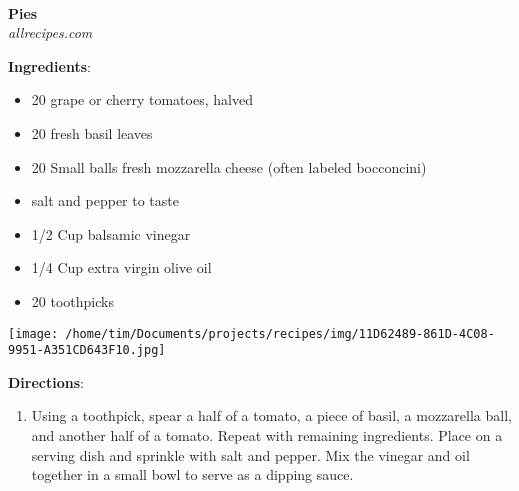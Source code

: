 \documentclass[11pt, twoside, openany]{book}
\begin{document}
{\\\LARGE \textbf{Pies}} \label{pies}\\
 \label{tomato-and-mozzarella-bites}\hfill\textit{allrecipes.com}\\
\begin{minipage}[t]{0.8\linewidth}
\textbf{Ingredients}:\vspace{-3mm}
\begin{multicols}{2}
\begin{itemize}\setlength\itemsep{-1mm}
\item 20 grape or cherry tomatoes, halved
\item 20 fresh basil leaves
\item 20 Small balls fresh mozzarella cheese (often labeled bocconcini)
\item salt and pepper to taste
\item 1/2 Cup balsamic vinegar
\item 1/4 Cup extra virgin olive oil
\item 20 toothpicks
\end{itemize}
\end{multicols}
\end{minipage}
\begin{minipage}[t]{0.2\linewidth}
\centering \strut\vspace*{-\baselineskip}\newline
\texttt{[image: /home/tim/Documents/projects/recipes/img/11D62489-861D-4C08-9951-A351CD643F10.jpg]}\\
\end{minipage}\vspace{3mm}
\textbf{Directions}:
\vspace{-3mm}\begin{enumerate}\setlength\itemsep{-1mm}
\item Using a toothpick, spear a half of a tomato, a piece of basil, a mozzarella ball, and another half of a tomato. Repeat with remaining ingredients. Place on a serving dish and sprinkle with salt and pepper. Mix the vinegar and oil together in a small bowl to serve as a dipping sauce.
\end{enumerate}
 \label{grilled-pizza-with-strawberries-and-chocolate}\hfill\textit{}\\
\end{document}
